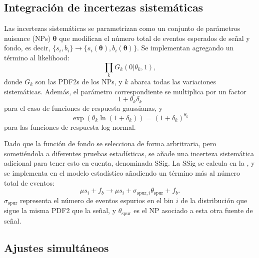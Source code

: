 \subsection{Integración de incertezas sistemáticas}
\label{subsec:strategy:stat_treatment:systs}

Las incertezas sistemáticas se parametrizan como un conjunto de parámetros nuisance (\acp{NP}) \(\mathbf{\theta}\) que modifican el número total de eventos esperados de señal y fondo, es decir, \(\{s_i, b_i\} \to \{s_i(\mathbf{\theta}), b_i(\mathbf{\theta})\}\). Se implementan agregando un término al likelihood:
\begin{equation}
    \prod_{k} G_k(0 | \theta_k, 1),
\end{equation}
donde \(G_k\) son las \acp{PDF2} de los \acp{NP}, y \(k\) abarca todas las variaciones sistemáticas. Además, el parámetro correspondiente se multiplica por un factor
\begin{equation}
    1 + \theta_k \delta_k
\end{equation}
para el caso de funciones de respuesta gaussianas, y
\begin{equation}
    \exp\left( \theta_k \ln\left(1 + \delta_k\right) \right) = \left(1 + \delta_k\right)^{\theta_k}
\end{equation}
para las funciones de respuesta log-normal.

Dado que la función de fondo se selecciona de forma arbritraria, pero sometiéndola a diferentes pruebas estadísticas, se añade una incerteza sistemática adicional para tener esto en cuenta, denominada \acf{SSig}. La \ac{SSig} se calcula en la \Sect{\ref{subsubsec:bkg:modeling:sigbkg:sstest}}, y se implementa en el modelo estadístico añadiendo un término más al número total de eventos:
\begin{equation}
    \mu s_i + f_b \to \mu s_i + \sigma_{\text{spur}, i} \theta_{\text{spur}} + f_b.
\end{equation}
\(\sigma_{\text{spur}}\) representa el número de eventos espurios en el bin \(i\) de la distribución que sigue la misma \ac{PDF2} que la señal, y \(\theta_{\text{spur}}\) es el \ac{NP} asociado a esta otra fuente de señal.

\subsection{Ajustes simultáneos}
\label{subsec:strategy:stat_treatment:simult_fits}

